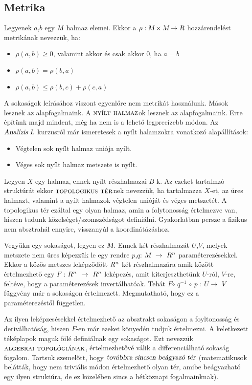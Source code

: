 \documentclass[a4paper, 12pt]{article}
\begin{document}
\subsection{Metrika}
\par Legyenek $a$,$b$ egy $\textsl{M}$ halmaz elemei. Ekkor a $\rho : \textsl{M} \times \textsl{M} \rightarrow \textsl{R}$ hozzárendelést metrikának nevezzük, ha:
\begin{itemize}
\item $\rho(a,b) \geq 0$, valamint akkor és csak akkor $0$, ha $a = b$
\item $\rho(a,b) = \rho(b,a)$
\item $\rho(a,b) \leq \rho(b,c) + \rho(c,a)$
\end{itemize}
\par A sokaságok leírásához viszont egyenlőre nem metrikát használunk. Mások lesznek az alapfogalmaink. A $\textsc{nyílt halmaz}$ok lesznek az alapfogalmaink. Erre építünk majd mindent, még ha nem is a lehető legprecízebb módon. Az $\textsl{Analízis I.}$ kurzusról már ismeretesek a nyílt halamzokra vonatkozó alapállítások:
\begin{itemize}
\item Végtelen sok nyílt halmaz uniója nyílt.
\item Véges sok nyílt halmaz metszete is nyílt.
\end{itemize}
\par Legyen $X$ egy halmaz, ennek nyílt részhalmazai $B$-k. Az ezeket tartalmzó struktúrát ekkor $\textsc{topologikus tér}$nek nevezzük, ha tartalmazza $X$-et, az üres halmazt, valamint a nyílt halmazok végtelen unióját és véges metszetét. A topologikus tér ezáltal egy olyan halmaz, amin a folytonosság értelmezve van, hiszen tudunk közelséget/szomszédságot definiálni. Gyakorlatban persze a fizikus nem absztrahál ennyire, visszanyúl a koordinátázáshoz.
\par Vegyükn egy sokaságot, legyen ez $\textsl{M}$. Ennek két részhalmazát $U$,$V$, melyek metszete nem üres képezzük le egy  rendre $p$,$q$: $\textsl{M}$  $\rightarrow$ $\textsl{$R^{n}$}$ paraméterezésekkel. Ekkor a közös metszes leképződött $\textsl{$R^{n}$}$ két részhalmazára amik között értelmezhető egy $F$ : $\textsl{$R^{n}$}$ $\rightarrow$ $\textsl{$R^{n}$}$ leképezés, amit kiterjeszthetünk $U$-ról, $V$-re, feltéve, hogy a paraméterezések invertálhatóak. Tehát $F$$\circ$ $q^{-1}$ $\circ$ $p$ : $U$$\rightarrow$ $V$ függvény már a sokaságon értelmezett. Megmutatható, hogy ez a paraméterezéstől független. 
\par Az ilyen leképzesésekkel értelmezhető az absztrakt sokaságon a foyltonosság és deriválhatóság, hiszen $F$-en már ezeket könyedén tudjuk értelmezni. A keletkezett téképlapok maguk fölé definiálnak egy sokaságot. Ezt nevezzük $\textsc{algebrai topológiának}$, értelmezhetővé válik a differenciálható sokaság fogalom. Tartsuk szemelőtt, hogy $\textsl{továbbra sincsen beágyazó tér}$ (matematikusok belátták, hogy nem triviális módon értelmezhető olyan tér, amibe beágyazható egy ilyen struktúra, de ez közelében sincs a hétköznapi fogalmainknak). 
\end{document}
